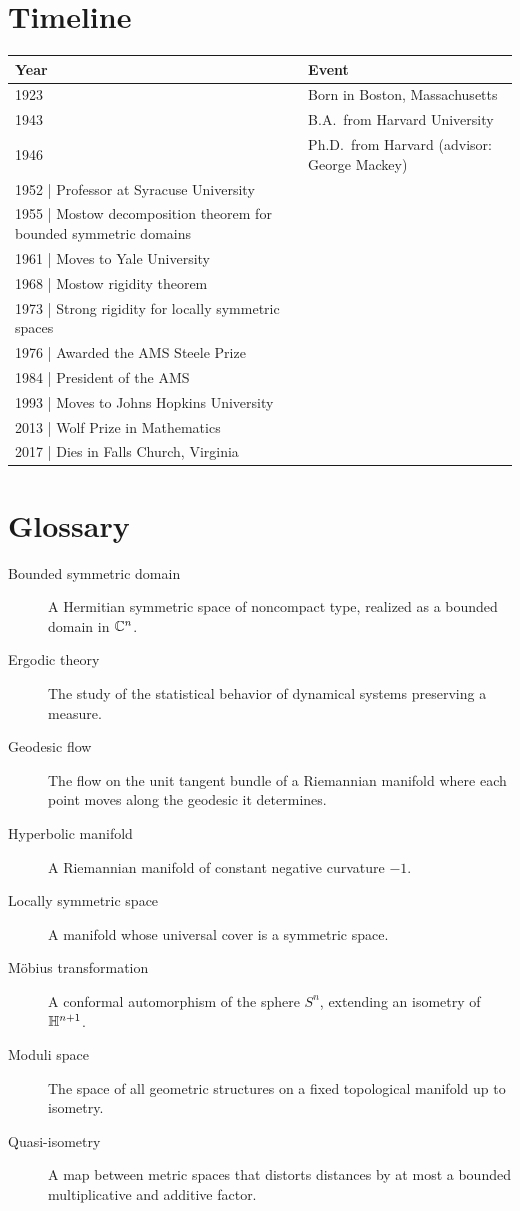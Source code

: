 \section*{Timeline}

\begin{tabularx}{\linewidth}{|p{1.5cm}|>{\raggedright\arraybackslash}X|}
\hline
\textbf{Year} & \textbf{Event} \\ \hline
1923 & Born in Boston, Massachusetts \\ \hline
1943 & B.A.\ from Harvard University \\ \hline
1946 & Ph.D.\ from Harvard (advisor: George Mackey) \\ \hline
1952 | Professor at Syracuse University \\ \hline
1955 | Mostow decomposition theorem for bounded symmetric domains \\ \hline
1961 | Moves to Yale University \\ \hline
1968 | Mostow rigidity theorem \\ \hline
1973 | Strong rigidity for locally symmetric spaces \\ \hline
1976 | Awarded the AMS Steele Prize \\ \hline
1984 | President of the AMS \\ \hline
1993 | Moves to Johns Hopkins University \\ \hline
2013 | Wolf Prize in Mathematics \\ \hline
2017 | Dies in Falls Church, Virginia \\ \hline
\end{tabularx}

\section*{Glossary}

\begin{description}
    \item[Bounded symmetric domain] A Hermitian symmetric space of noncompact type, realized as a bounded domain in $\mathbb{C}^n$.
    \item[Ergodic theory] The study of the statistical behavior of dynamical systems preserving a measure.
    \item[Geodesic flow] The flow on the unit tangent bundle of a Riemannian manifold where each point moves along the geodesic it determines.
    \item[Hyperbolic manifold] A Riemannian manifold of constant negative curvature $-1$.
    \item[Locally symmetric space] A manifold whose universal cover is a symmetric space.
    \item[M\"obius transformation] A conformal automorphism of the sphere $S^n$, extending an isometry of $\mathbb{H}^{n+1}$.
    \item[Moduli space] The space of all geometric structures on a fixed topological manifold up to isometry.
    \item[Quasi-isometry] A map between metric spaces that distorts distances by at most a bounded multiplicative and additive factor.
\end{description}

